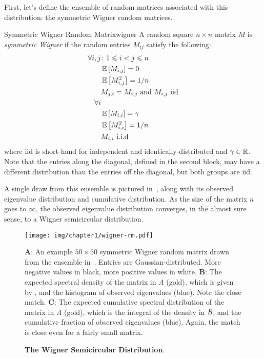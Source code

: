 \documentclass[../../thesis.tex]{subfiles}
\begin{document}
First, let's define the ensemble of random matrices
associated with this distribution:
the symmetric Wigner random matrices.
\begin{definition}{Symmetric Wigner Random Matrix}{wigner}
	A random square $n\times n$ matrix $M$ is \emph{symmetric Wigner}
	if the random entries $M_{ij}$ satisfy the following:
	\begin{align*}
		\forall i,j &\suchthat 1 \leq i < j \leq n\\
			&\Ex{M_{i, j}} = 0\\
			&\Ex{M_{i, j}^2} = 1/n\\
			&M_{j, i} = M_{i, j} \text{\ and\ } M_{i, j} \text{\ iid}\\
		\forall i\\
			&\Ex{M_{i, i}} = \gamma\\
			&\Ex{M_{i, i}^2} = 1/n\\
			&M_{i, i} \text{\ i.i.d}
	\end{align*}
	where iid is short-hand for independent
	and identically-distributed
	and $\gamma \in \mathbb{R}$.
	Note that the entries along the diagonal,
	defined in the second block,
	may have a different
	distribution than the entries off the diagonal,
	but both groups are iid.
\end{definition}

A single draw from this ensemble is pictured
in~,
along with its observed eigenvalue distribution
and cumulative distribution.
As the size of the matrix $n$ goes to $\infty$,
the observed eigenvalue distribution converges,
in the almost sure sense,
to a Wigner semicircular distribution.

\begin{figure}[ht]
	\begin{center}
		\texttt{[image: img/chapter1/wigner-rm.pdf]}
	\end{center}
	\caption{\textbf{The Wigner Semicircular Distribution}.}%
	{\textbf{A}: An example $50\times50$ symmetric Wigner random matrix drawn from the ensemble
		in~. Entries are Gaussian-distributed.
		More negative values in black, more positive values in white.
	\textbf{B}: The expected spectral density of the matrix in \emph{A} (gold),
		which is given by ,
		and the histogram of observed eigenvalues (blue). Note the close match.
	\textbf{C}: The expected cumulative spectral distribution
		of the matrix in \emph{A} (gold), which is the integral of the
		density in $\emph{B}$, and the cumulative fraction of observed eigenvalues (blue).
		Again, the match is close even for a fairly small matrix.
}
\end{figure}
\end{document}
